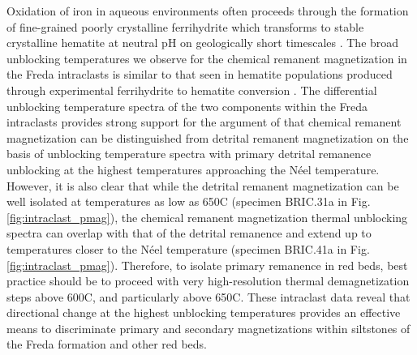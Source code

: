 \documentclass[11pt,letterpaper]{article}
\begin{document}
Oxidation of iron in aqueous environments often proceeds through the formation of fine-grained poorly crystalline ferrihydrite which transforms to stable crystalline hematite at neutral pH on geologically short timescales \citep{Cudennec2006a}. The broad unblocking temperatures we observe for the chemical remanent magnetization in the Freda intraclasts is similar to that seen in hematite populations produced through experimental ferrihydrite to hematite conversion \citep{Jiang2015a}. The differential unblocking temperature spectra of the two components within the Freda intraclasts provides strong support for the argument of \cite{Jiang2015a} that chemical remanent magnetization can be distinguished from detrital remanent magnetization on the basis of unblocking temperature spectra with primary detrital remanence unblocking at the highest temperatures approaching the N\'eel temperature. However, it is also clear that while the detrital remanent magnetization can be well isolated at temperatures as low as 650\textdegree C (specimen BRIC.31a in Fig. \ref{fig:intraclast_pmag}), the chemical remanent magnetization thermal unblocking spectra can overlap with that of the detrital remanence and extend up to temperatures closer to the N\'eel temperature (specimen BRIC.41a in Fig. \ref{fig:intraclast_pmag}). Therefore, to isolate primary remanence in red beds, best practice should be to proceed with very high-resolution thermal demagnetization steps above 600\textdegree C, and particularly above 650\textdegree C. These intraclast data reveal that directional change at the highest unblocking temperatures provides an effective means to discriminate primary and secondary magnetizations within siltstones of the Freda formation and other red beds. 


 
%
\end{document}
